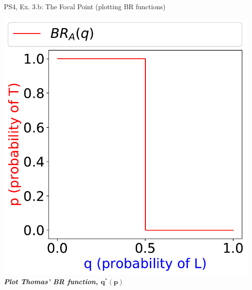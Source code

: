 \begin{frame}{PS4, Ex. 3.b: The Focal Point (plotting BR functions)}
\begin{multicols}{2}
    \vfill\null \columnbreak
    \includegraphics[width=\columnwidth]{figures/3b_}
    \textbf{\textit{Plot Thomas' BR function, $\bm{q^{*}(p)}$}}
  \vfill\null
  \end{multicols}
\end{frame}
